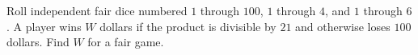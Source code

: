 Roll independent fair dice numbered $1$ through $100$, $1$ through $4$, and $1$ through $6$. A player wins $W$ dollars if the product is divisible by $21$ and otherwise loses $100$ dollars. Find $W$ for a fair game.
